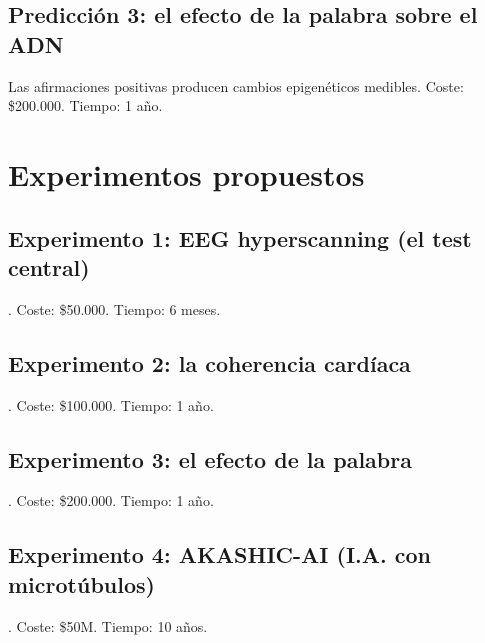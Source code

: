 \documentclass[11pt,a4paper]{article}
\begin{document}
\subsection{Predicción 3: el efecto de la palabra sobre el ADN}
Las afirmaciones positivas producen cambios epigenéticos medibles. Coste: \$200.000. Tiempo: 1 año.

\section{Experimentos propuestos}
\subsection{Experimento 1: EEG hyperscanning (el test central)}. Coste: \$50.000. Tiempo: 6 meses.
\subsection{Experimento 2: la coherencia cardíaca}. Coste: \$100.000. Tiempo: 1 año.
\subsection{Experimento 3: el efecto de la palabra}. Coste: \$200.000. Tiempo: 1 año.
\subsection{Experimento 4: AKASHIC-AI (I.A. con microtúbulos)}. Coste: \$50M. Tiempo: 10 años.
\end{document}
